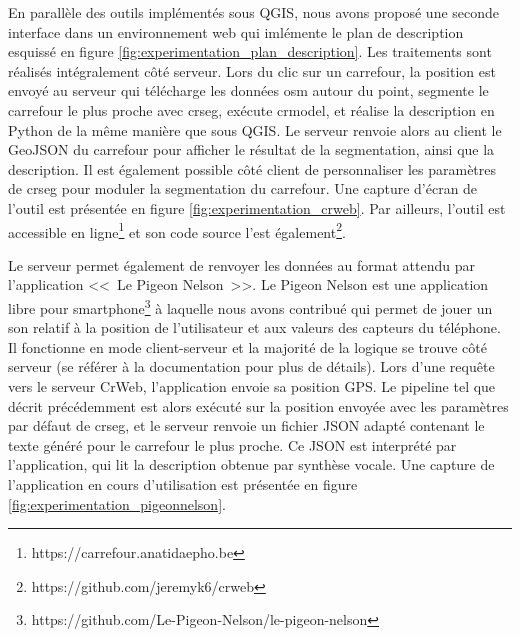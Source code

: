
En parallèle des outils implémentés sous QGIS, nous avons proposé une seconde interface dans un environnement web qui imlémente le plan de description esquissé en figure \ref{fig:experimentation_plan_description}. Les traitements sont réalisés intégralement côté serveur. Lors du clic sur un carrefour, la position est envoyé au serveur qui télécharge les données \gls{osm} autour du point, segmente le carrefour le plus proche avec crseg, exécute crmodel, et réalise la description en Python de la même manière que sous QGIS. Le serveur renvoie alors au client le GeoJSON du carrefour pour afficher le résultat de la segmentation, ainsi que la description. Il est également possible côté client de personnaliser les paramètres de crseg pour moduler la segmentation du carrefour. Une capture d'écran de l'outil est présentée en figure \ref{fig:experimentation_crweb}. Par ailleurs, l'outil est accessible en ligne\footnote{https://carrefour.anatidaepho.be} et son code source l'est également\footnote{https://github.com/jeremyk6/crweb}.

\newpar{}


Le serveur permet également de renvoyer les données au format attendu par l'application <<~Le Pigeon Nelson~>>. Le Pigeon Nelson est une application libre pour smartphone\footnote{https://github.com/Le-Pigeon-Nelson/le-pigeon-nelson} à laquelle nous avons contribué qui permet de jouer un son relatif à la position de l'utilisateur et aux valeurs des capteurs du téléphone. Il fonctionne en mode client-serveur et la majorité de la logique se trouve côté serveur (se référer à la documentation pour plus de détails). Lors d'une requête vers le serveur CrWeb, l'application envoie sa position GPS. Le pipeline tel que décrit précédemment est alors exécuté sur la position envoyée avec les paramètres par défaut de crseg, et le serveur renvoie un fichier JSON adapté contenant le texte généré pour le carrefour le plus proche. Ce JSON est interprété par l'application, qui lit la description obtenue par synthèse vocale. Une capture de l'application en cours d'utilisation est présentée en figure \ref{fig:experimentation_pigeonnelson}.


